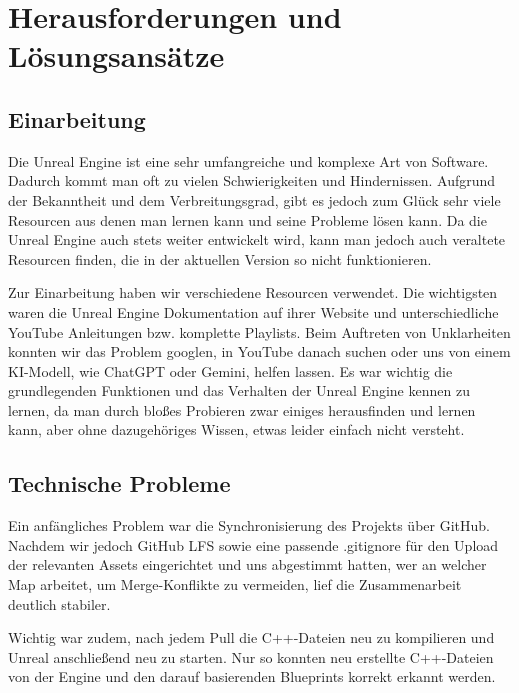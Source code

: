 \documentclass[oneside]{ausarbeitung}
\begin{document}

\chapter{Herausforderungen und Lösungsansätze}
\label{cha:herausforderungenundlösungsansätze}

\section{Einarbeitung}
\label{sec:einarbeitung}

Die Unreal Engine ist eine sehr umfangreiche und komplexe Art von Software. Dadurch kommt man oft zu vielen Schwierigkeiten und Hindernissen. Aufgrund der Bekanntheit und dem Verbreitungsgrad, gibt es jedoch zum Glück sehr viele Resourcen aus denen man lernen kann und seine Probleme lösen kann. Da die Unreal Engine auch stets weiter entwickelt wird, kann man jedoch auch veraltete Resourcen finden, die in der aktuellen Version so nicht funktionieren.

Zur Einarbeitung haben wir verschiedene Resourcen verwendet. Die wichtigsten waren die Unreal Engine Dokumentation auf ihrer Website und unterschiedliche YouTube Anleitungen bzw. komplette Playlists. 
Beim Auftreten von Unklarheiten konnten wir das Problem googlen, in YouTube danach suchen oder uns von einem KI-Modell, wie ChatGPT oder Gemini, helfen lassen. Es war wichtig die grundlegenden Funktionen und das Verhalten der Unreal Engine kennen zu lernen, da man durch bloßes Probieren zwar einiges herausfinden und lernen kann, aber ohne dazugehöriges Wissen, etwas leider einfach nicht versteht.


\section{Technische Probleme}
\label{sec:technischeprobleme}

Ein anfängliches Problem war die Synchronisierung des Projekts über GitHub. Nachdem wir jedoch GitHub LFS sowie eine passende .gitignore für den Upload der relevanten Assets eingerichtet und uns abgestimmt hatten, wer an welcher Map arbeitet, um Merge-Konflikte zu vermeiden, lief die Zusammenarbeit deutlich stabiler.

Wichtig war zudem, nach jedem Pull die C++-Dateien neu zu kompilieren und Unreal anschließend neu zu starten. Nur so konnten neu erstellte C++-Dateien von der Engine und den darauf basierenden Blueprints korrekt erkannt werden.
\end{document}
